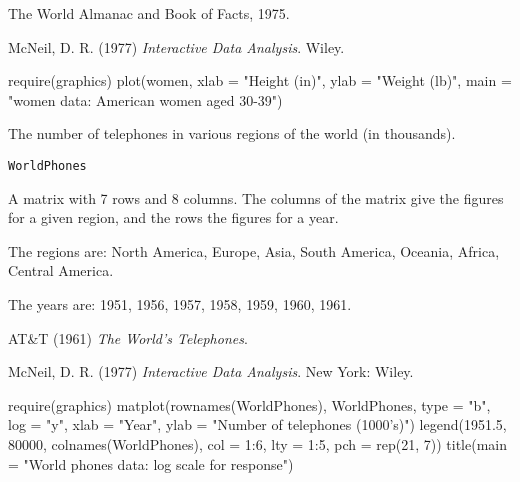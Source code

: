 %
\begin{Source}\relax
The World Almanac and Book of Facts, 1975.
\end{Source}
%
\begin{References}\relax
McNeil, D. R. (1977)
\emph{Interactive Data Analysis}.
Wiley.
\end{References}
%
\begin{Examples}
\begin{ExampleCode}
require(graphics)
plot(women, xlab = "Height (in)", ylab = "Weight (lb)",
     main = "women data: American women aged 30-39")
\end{ExampleCode}
\end{Examples}
%
\begin{Description}\relax
The number of telephones in various regions of the world (in
thousands).
\end{Description}
%
\begin{Usage}
\begin{verbatim}
WorldPhones
\end{verbatim}
\end{Usage}
%
\begin{Format}
A matrix with 7 rows and 8 columns.  The columns of the matrix give
the figures for a given region, and the rows the figures for a year.

The regions are: North America, Europe, Asia, South America, Oceania,
Africa, Central America.

The years are: 1951, 1956, 1957, 1958, 1959, 1960, 1961.
\end{Format}
%
\begin{Source}\relax
AT\&T (1961) \emph{The World's Telephones}.
\end{Source}
%
\begin{References}\relax
McNeil, D. R. (1977)
\emph{Interactive Data Analysis}.
New York: Wiley.
\end{References}
%
\begin{Examples}
\begin{ExampleCode}
require(graphics)
matplot(rownames(WorldPhones), WorldPhones, type = "b", log = "y",
        xlab = "Year", ylab = "Number of telephones (1000's)")
legend(1951.5, 80000, colnames(WorldPhones), col = 1:6, lty = 1:5, 
       pch = rep(21, 7))
title(main = "World phones data: log scale for response")
\end{ExampleCode}
\end{Examples}
